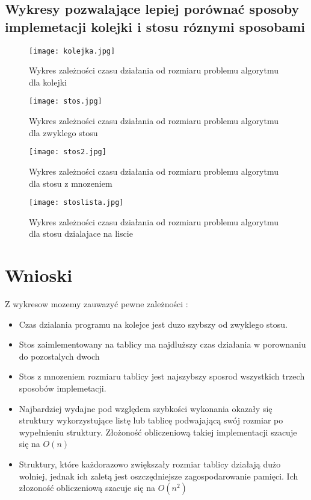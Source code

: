 \documentclass[11pt]{article}
\begin{document}
\subsection{Wykresy pozwalające lepiej porównać sposoby implemetacji kolejki i stosu róznymi sposobami}
 \begin{center}
 \begin{figure}[ht!] 
\centering
 \texttt{[image: kolejka.jpg]}
 \caption{Wykres zależności czasu działania od rozmiaru problemu algorytmu dla kolejki } 
\label{overflow}
 \end{figure}

 \begin{figure}[ht!] 
\centering
 \texttt{[image: stos.jpg]}
 \caption{Wykres zależności  czasu działania od rozmiaru problemu  algorytmu dla zwyklego stosu} 
\label{overflow}
 \end{figure}

 \begin{figure}[ht!] 
\centering
 \texttt{[image: stos2.jpg]}
 \caption{Wykres zależności  czasu działania od rozmiaru problemu  algorytmu dla stosu z mnozeniem} 
\label{overflow}
 \end{figure}
 \begin{figure}[ht!] 
\centering
 \texttt{[image: stoslista.jpg]}
 \caption{Wykres zależności czasu działania od rozmiaru problemu  algorytmu dla stosu dzialajace na liscie} 
\label{overflow}
 \end{figure}

\newpage

\section{Wnioski}
Z wykresow mozemy zauwazyć pewne zależności :
\begin{itemize}
 \item Czas dzialania programu na kolejce jest duzo szybszy od zwyklego stosu.
\item Stos zaimlementowany na tablicy ma najdluższy czas działania w porownaniu do pozostalych dwoch  \item Stos z mnozeniem rozmiaru tablicy jest najszybszy sposrod wszystkich trzech sposobów implemetacji. 
\item Najbardziej wydajne pod względem szybkości wykonania okazały się struktury wykorzystujące listę lub tablicę podwajającą swój rozmiar po wypełnieniu struktury.
Złożoność obliczeniową takiej implementacji szacuje się na $ O(n) $
\item Struktury, które każdorazowo zwiększały rozmiar tablicy działają dużo wolniej, jednak ich zaletą jest oszczędniejsze  zagospodarowanie pamięci.
Ich złozoność obliczeniową szacuje się na $ O(n^{2}) $
\end{itemize}
\end{center}
 
\end{document}
